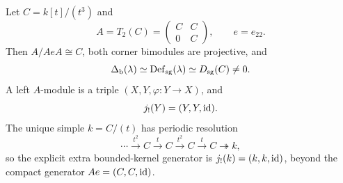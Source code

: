 \begin{example}\label{ex:triangular}
Let \(C=k[t]/(t^3)\) and
\[
 A=T_2(C)=
 \begin{pmatrix}C&C\\0&C\end{pmatrix},
 \qquad e=e_{22}.
\]
Then \(A/AeA\cong C\), both corner bimodules are projective, and
\[
 \Delta_{\mathrm b}(\lambda)
 \simeq
 \operatorname{Def}_{\mathrm{sg}}(\lambda)
 \simeq
 D_{\mathrm{sg}}(C)\ne0.
\]
A left \(A\)-module is a triple \((X,Y,\varphi:Y\to X)\), and
\[
 j_!(Y)=(Y,Y,\operatorname{id}).
\]
The unique simple \(k=C/(t)\) has periodic resolution
\[
 \cdots\xrightarrow{t^2}C\xrightarrow{t}C
 \xrightarrow{t^2}C\xrightarrow{t}C\twoheadrightarrow k,
\]
so the explicit extra bounded-kernel generator is
\(j_!(k)=(k,k,\operatorname{id})\), beyond the compact generator
\(Ae=(C,C,\operatorname{id})\).
\end{example}

